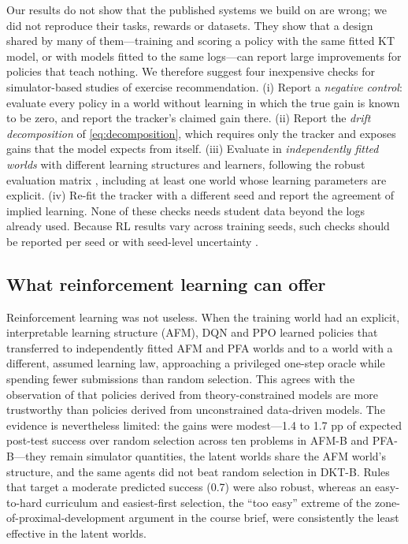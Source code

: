 \documentclass[a4paper,preprint,12pt,authoryear]{elsarticle}
\begin{document}
Our results do not show that the published systems we build on are wrong; we did not reproduce their tasks, rewards or datasets. They show that a design shared by many of them---training and scoring a policy with the same fitted KT model, or with models fitted to the same logs---can report large improvements for policies that teach nothing. We therefore suggest four inexpensive checks for simulator-based studies of exercise recommendation. (i) Report a \emph{negative control}: evaluate every policy in a world without learning in which the true gain is known to be zero, and report the tracker's claimed gain there. (ii) Report the \emph{drift decomposition} of \cref{eq:decomposition}, which requires only the tracker and exposes gains that the model expects from itself. (iii) Evaluate in \emph{independently fitted worlds} with different learning structures and learners, following the robust evaluation matrix \citep{doroudi2017rem}, including at least one world whose learning parameters are explicit. (iv) Re-fit the tracker with a different seed and report the agreement of implied learning. None of these checks needs student data beyond the logs already used. Because RL results vary across training seeds, such checks should be reported per seed or with seed-level uncertainty \citep{henderson2018matters,agarwal2021precipice}.

\subsection{What reinforcement learning can offer}

Reinforcement learning was not useless. When the training world had an explicit, interpretable learning structure (AFM), DQN and PPO learned policies that transferred to independently fitted AFM and PFA worlds and to a world with a different, assumed learning law, approaching a privileged one-step oracle while spending fewer submissions than random selection. This agrees with the observation of \citet{doroudi2019reward} that policies derived from theory-constrained models are more trustworthy than policies derived from unconstrained data-driven models. The evidence is nevertheless limited: the gains were modest---1.4 to 1.7 pp of expected post-test success over random selection across ten problems in AFM-B and PFA-B---they remain simulator quantities, the latent worlds share the AFM world's structure, and the same agents did not beat random selection in DKT-B. Rules that target a moderate predicted success (0.7) were also robust, whereas an easy-to-hard curriculum and easiest-first selection, the ``too easy'' extreme of the zone-of-proximal-development argument in the course brief, were consistently the least effective in the latent worlds.
\end{document}
